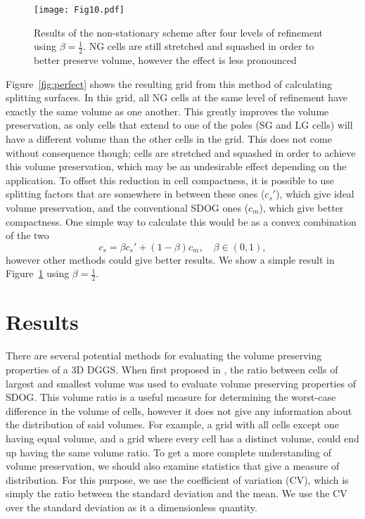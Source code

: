 \begin{figure}[tb]
	\texttt{[image: Fig10.pdf]}
	\caption[Title]{
		Results of the non-stationary scheme after four levels of refinement using $\beta = \frac{1}{2}$.
		NG cells are still stretched and squashed in order to better preserve volume, however the effect is less pronounced
	}
	\label{fig:balanced}
\end{figure}


Figure~\ref{fig:perfect} shows the resulting grid from this method of calculating splitting surfaces.
In this grid, all NG cells at the same level of refinement have exactly the same volume as one another.
This greatly improves the volume preservation, as only cells that extend to one of the poles (SG and LG cells) will have a different volume than the other cells in the grid.
This does not come without consequence though; cells are stretched and squashed in order to achieve this volume preservation, which may be an undesirable effect depending on the application.
To offset this reduction in cell compactness, it is possible to use splitting factors that are somewhere in between these ones ($c_{s}'$), which give ideal volume preservation, and the conventional SDOG ones ($c_{m}$), which give better compactness.
One simple way to calculate this would be as a convex combination of the two
%
\begin{equation}
c_{s} = \beta c_{s}' + \left( 1 - \beta \right)c_{m}, \quad \beta \in \left( 0,1 \right),
\label {eq:beta}
\end{equation}
%
however other methods could give better results.
We show a simple result in Figure~\ref{fig:balanced} using $\beta = \frac{1}{2}$.

\section{Results}
There are several potential methods for evaluating the volume preserving properties of a 3D DGGS.
When first proposed in \cite{yu2009sdog}, the ratio between cells of largest and smallest volume was used to evaluate volume preserving properties of SDOG.
This volume ratio is a useful measure for determining the worst-case difference in the volume of cells, however it does not give any information about the distribution of said volumes.
For example, a grid with all cells except one having equal volume, and a grid where every cell has a distinct volume, could end up having the same volume ratio.
To get a more complete understanding of volume preservation, we should also examine statistics that give a measure of distribution.
For this purpose, we use the coefficient of variation (CV), which is simply the ratio between the standard deviation and the mean.
We use the CV over the standard deviation as it a dimensionless quantity.


